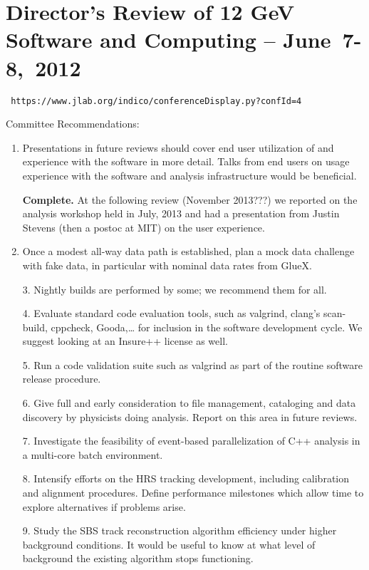 \documentclass[12pt]{article}
\begin{document}
\section{Director's Review of 12 GeV Software and Computing -- June~7-8,~2012}

\begin{center}\tt
https://www.jlab.org/indico/conferenceDisplay.py?confId=4
\end{center}

Committee Recommendations:

\begin{enumerate}

\item Presentations in future reviews should cover end user
  utilization of and experience with the software in more
  detail. Talks from end users on usage experience with the software
  and analysis infrastructure would be beneficial.

  {\bf Complete.} At the following review (November 2013???) we reported on the analysis workshop held in July, 2013 and had a presentation from Justin Stevens (then a postoc at MIT) on the user experience.

\item Once a modest all-way data path is established, plan a mock data
  challenge with fake data, in particular with nominal data rates from
  GlueX.

3. Nightly builds are performed by some; we recommend them for all.

4. Evaluate standard code evaluation tools, such as valgrind, clang’s scan-build, cppcheck, Gooda,… for inclusion in the software development cycle. We suggest looking at an Insure++ license as well.

5. Run a code validation suite such as valgrind as part of the routine software release procedure.

6. Give full and early consideration to file management, cataloging and data discovery by physicists doing analysis. Report on this area in future reviews.

7. Investigate the feasibility of event-based parallelization of C++ analysis in a multi-core batch environment.

8. Intensify efforts on the HRS tracking development, including calibration and alignment procedures. Define performance milestones which allow time to explore alternatives if problems arise.

9. Study the SBS track reconstruction algorithm efficiency under higher background conditions. It would be useful to know at what level of background the existing algorithm stops functioning.


\end{enumerate}
\end{document}
